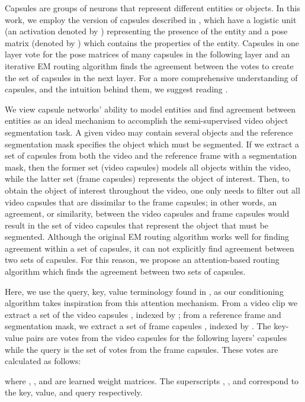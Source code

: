 \documentclass[10pt,twocolumn,letterpaper]{article}
\begin{document}
Capsules are groups of neurons that represent different entities or objects. In this work, we employ the version of capsules described in \cite{hinton2018matrix}, which have a logistic unit (an activation denoted by ) representing the presence of the entity and a  pose matrix (denoted by ) which contains the properties of the entity. Capsules in one layer vote for the pose matrices of many capsules in the following layer and an iterative EM routing algorithm finds the agreement between the votes to create the set of capsules in the next layer. For a more comprehensive understanding of capsules, and the intuition behind them, we suggest reading \cite{sabour2017dynamic, hinton2018matrix}.

We view capsule networks' ability to model entities and find agreement between entities as an ideal mechanism to accomplish the semi-supervised video object segmentation task. A given video may contain several objects and the reference segmentation mask specifies the object which must be segmented. If we extract a set of capsules from both the video and the reference frame with a segmentation mask, then the former set (video capsules) models all objects within the video, while the latter set (frame capsules) represents the object of interest. Then, to obtain the object of interest throughout the video, one only needs to filter out all video capsules that are dissimilar to the frame capsules; in other words, an agreement, or similarity, between the video capsules and frame capsules would result in the set of video capsules that represent the object that must be segmented. Although the original EM routing algorithm works well for finding agreement within a set of capsules, it can not explicitly find agreement between two sets of capsules. For this reason, we propose an attention-based routing algorithm which finds the agreement between two sets of capsules.

Here, we use the query, key, value terminology found in \cite{vaswani2017attention}, as our conditioning algorithm takes inspiration from this attention mechanism. From a video clip we extract a set of the video capsules , indexed by ; from a reference frame and segmentation mask, we extract a set of frame capsules , indexed by . The key-value pairs are votes from the video capsules for the following layers' capsules while the query is the set of votes from the frame capsules. These votes are calculated as follows:

where , , and  are learned weight matrices. The superscripts , , and  correspond to the key, value, and query respectively.
\end{document}
